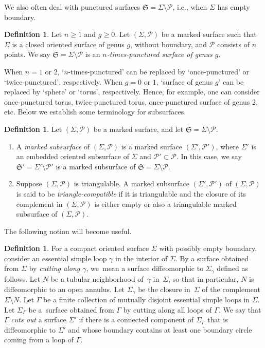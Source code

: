 \documentclass[pdftex]{sigma}
\numberwithin{equation}{section}
\theoremstyle{definition}
\newtheorem{Definition}[Theorem]{Definition}
\begin{document}
We also often deal with punctured surfaces $\mathfrak{S} = \Sigma\setminus\mathcal{P}$, i.e., when $\Sigma$ has empty boundary.
\begin{Definition}
Let $n\ge 1$ and $g\ge 0$. Let $(\Sigma,\mathcal{P})$ be a marked surface such that $\Sigma$ is a closed oriented surface of genus $g$, without boundary, and $\mathcal{P}$ consists of $n$ points. We say $\mathfrak{S} = \Sigma\setminus\mathcal{P}$ is an {\em $n$-times-punctured surface of genus $g$}.
\end{Definition}
When $n=1$ or $2$, `$n$-times-punctured' can be replaced by `once-punctured' or `twice\nobreakdash-punc\-tured', respectively. When $g=0$ or $1$, `surface of genus $g$' can be replaced by `sphere' or `torus', respectively. Hence, for example, one can consider once-punctured torus, twice-punctured torus, once-punctured surface of genus $2$, etc.
Below we establish some terminology for subsurfaces.
\begin{Definition}
\label{def:subsurfaces}
Let $(\Sigma, \mathcal{P})$ be a marked surface, and let $\mathfrak{S} = \Sigma\setminus\mathcal{P}$.
\begin{enumerate}[label={\rm (\arabic*)}]\itemsep=0pt
\item A {\em marked subsurface} of $(\Sigma,\mathcal{P})$ is a marked surface $(\Sigma',\mathcal{P}')$, where $\Sigma'$ is an embedded oriented subsurface of $\Sigma$ and $\mathcal{P}' \subset \mathcal{P}$. In this case, we say $\mathfrak{S}' = \Sigma'\setminus \mathcal{P}'$ is a marked subsurface of $\mathfrak{S} = \Sigma \setminus \mathcal{P}$.
\item Suppose $(\Sigma,\mathcal{P})$ is triangulable. A marked subsurface $(\Sigma',\mathcal{P}')$ of $(\Sigma,\mathcal{P})$ is said to be {\em triangle-compatible} if it is triangulable and the closure of its complement in $(\Sigma,\mathcal{P})$ is either empty or also a triangulable marked subsurface of $(\Sigma,\mathcal{P})$.
\end{enumerate}
\end{Definition}
The following notion will become useful.
\begin{Definition}\label{def:cutting}
For a compact oriented surface $\Sigma$ with possibly empty boundary, consider an essential simple loop $\gamma$ in the interior of $\Sigma$. By a surface obtained from $\Sigma$ by {\em cutting along $\gamma$}, we~mean a surface diffeomorphic to $\Sigma_\gamma$ defined as follows. Let $N$ be a tubular neighborhood of~$\gamma$ in~$\Sigma$, so that in particular, $N$ is diffeomorphic to an open annulus. Let $\Sigma_\gamma$ be the closure in~$\Sigma$ of the complement $\Sigma\setminus N$.
Let $\Gamma$ be a finite collection of mutually disjoint essential simple loops in $\Sigma$. Let $\Sigma_\Gamma$ be a~surface obtained from $\Gamma$ by cutting along all loops of $\Gamma$. We say that $\Gamma$ {\em cuts out} a surface $\Sigma'$ if there is a connected component of $\Sigma_\Gamma$ that is diffeomorphic to $\Sigma'$ and whose boundary contains at least one boundary circle coming from a loop of $\Gamma$.
\end{Definition}
\end{document}
